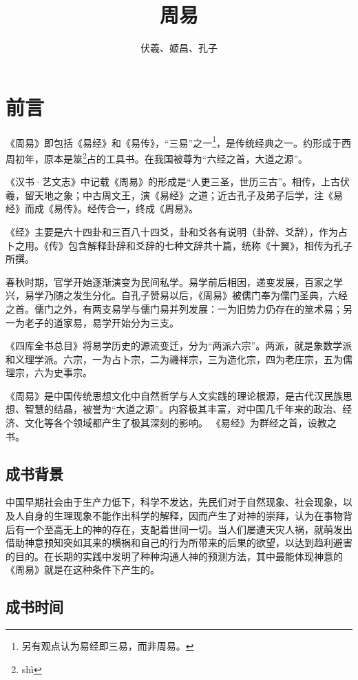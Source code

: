 \documentclass[a4paper,12pt,UTF8,twoside]{ctexbook}
\title{\heiti\zihao{0} 周易}
\author{伏羲、姬昌、孔子}
\date{}
\begin{document}
\maketitle
\tableofcontents

\frontmatter
\chapter{前言}

《周易》即包括《易经》和《易传》，“三易”之一\footnote{另有观点认为易经即三易，而非周易。}，是传统经典之一。约形成于西周初年，原本是筮\footnote{sh\`{i}}占的工具书。在我国被尊为“六经之首，大道之源”。

《汉书·艺文志》中记载《周易》的形成是“人更三圣，世历三古”。相传，上古伏羲，留天地之象；中古周文王，演《易经》之道；近古孔子及弟子后学，注《易经》而成《易传》。经传合一，终成《周易》。

《经》主要是六十四卦和三百八十四爻，卦和爻各有说明（卦辞、爻辞），作为占卜之用。《传》包含解释卦辞和爻辞的七种文辞共十篇，统称《十翼》，相传为孔子所撰。

春秋时期，官学开始逐渐演变为民间私学。易学前后相因，递变发展，百家之学兴，易学乃随之发生分化。自孔子赞易以后，《周易》被儒门奉为儒门圣典，六经之首。儒门之外，有两支易学与儒门易并列发展：一为旧势力仍存在的筮术易；另一为老子的道家易，易学开始分为三支。

《四库全书总目》将易学历史的源流变迁，分为“两派六宗”。两派，就是象数学派和义理学派。六宗，一为占卜宗，二为禨祥宗，三为造化宗，四为老庄宗，五为儒理宗，六为史事宗。

《周易》是中国传统思想文化中自然哲学与人文实践的理论根源，是古代汉民族思想、智慧的结晶，被誉为“大道之源”。内容极其丰富，对中国几千年来的政治、经济、文化等各个领域都产生了极其深刻的影响。
《易经》为群经之首，设教之书。

\section{成书背景}

中国早期社会由于生产力低下，科学不发达，先民们对于自然现象、社会现象，以及人自身的生理现象不能作出科学的解释，因而产生了对神的崇拜，认为在事物背后有一个至高无上的神的存在，支配着世间一切。当人们屡遭天灾人祸，就萌发出借助神意预知突如其来的横祸和自己的行为所带来的后果的欲望，以达到趋利避害的目的。在长期的实践中发明了种种沟通人神的预测方法，其中最能体现神意的《周易》就是在这种条件下产生的。

\section{成书时间}
\end{document}

